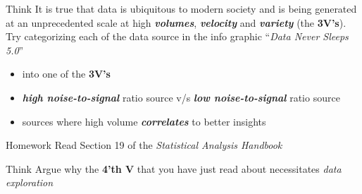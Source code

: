 \documentclass[12pt]{book}\usepackage{knitr}
\begin{document}
\begin{DIY}{Think}
It is true that data is ubiquitous to modern society and is being generated at an unprecedented scale at high \textbf{\emph{volumes}}, \textbf{\emph{velocity}} and \textbf{\emph{variety}} (the \textbf{3V's}). Try categorizing each of the data source in the info graphic ``\emph{Data Never Sleeps 5.0}''
\begin{itemize}
  \item into one of the \textbf{3V's}  
  \item \textbf{\emph{high noise-to-signal}} ratio source v/s \textbf{\emph{low noise-to-signal}} ratio source
  \item sources where high volume \textbf{\emph{correlates}} to better insights 
\end{itemize}
\end{DIY}

\begin{DIY}{Homework}
Read Section 19 of the \emph{Statistical Analysis Handbook}
\end{DIY}

\begin{DIY}{Think}
Argue why the \textbf{4'th V} that you have just read about necessitates \emph{data exploration}
\end{DIY}
\end{document}

